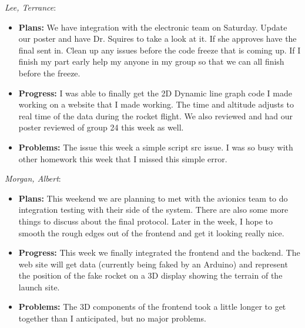 \documentclass[10pt,draftclsnofoot,onecolumn]{IEEEtran}
\newcommand{\subsubsubsection}[1]{
	\hfill\break\textit{#1}:
}
\begin{document}
\subsubsubsection{Lee, Terrance}
\begin{itemize}
	\item \textbf{Plans: }
	We have integration with the electronic team on Saturday. Update our poster and have Dr. Squires to take a look at it. If she approves have the final sent in. Clean up any issues before the code freeze that is coming up. If I finish my part early help my anyone in my group so that we can all finish before the freeze.
	\item \textbf{Progress:  }
	I was able to finally get the 2D Dynamic line graph code I made working on a website that I made working. The time and altitude adjusts to real time of the data during the rocket flight. We also reviewed and had our poster reviewed of group 24 this week as well.
	\item \textbf{Problems: }
	The issue this week a simple script src issue. I was so busy with other homework this week that I missed this simple error.
\end{itemize}


\subsubsubsection{Morgan, Albert}
\begin{itemize}
	\item \textbf{Plans: }
	This weekend we are planning to met with the avionics team to do integration testing with their side of the system. There are also some more things to discuss about the final protocol. Later in the week, I hope to smooth the rough edges out of the frontend and get it looking really nice.
	\item \textbf{Progress: }
	This week we finally integrated the frontend and the backend. The web site will get data (currently being faked by an Arduino) and represent the position of the fake rocket on a 3D display showing the terrain of the launch site.
	\item \textbf{Problems: }
	The 3D components of the frontend took a little longer to get together than I anticipated, but no major problems.
\end{itemize}
\end{document}
